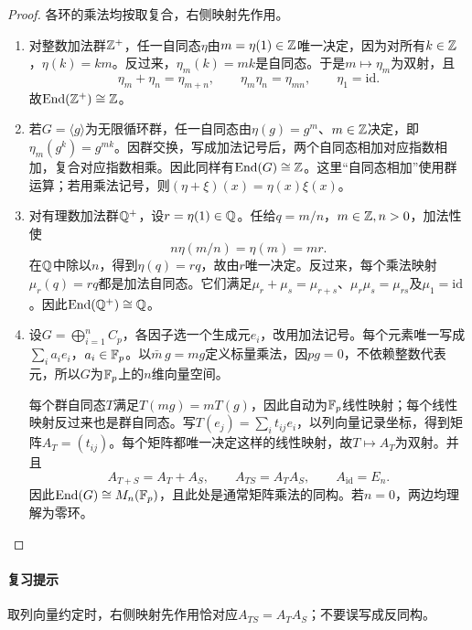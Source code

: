 \begin{proof}

各环的乘法均按取复合，右侧映射先作用。
\begin{enumerate}
\item 对整数加法群$\mathbb Z^+$，任一自同态$\eta$由$m=\eta(1)\in\mathbb Z$唯一决定，因为对所有$k\in\mathbb Z$，$\eta(k)=km$。反过来，$\eta_m(k)=mk$是自同态。于是$m\mapsto\eta_m$为双射，且
\[
\eta_m+\eta_n=\eta_{m+n},\qquad
\eta_m\eta_n=\eta_{mn},\qquad \eta_1=\mathrm{id}.
\]
故$\operatorname{End}(\mathbb Z^+)\cong\mathbb Z$。
\item 若$G=\langle g\rangle$为无限循环群，任一自同态由$\eta(g)=g^m$、$m\in\mathbb Z$决定，即$\eta_m(g^k)=g^{mk}$。因群交换，写成加法记号后，两个自同态相加对应指数相加，复合对应指数相乘。因此同样有$\operatorname{End}(G)\cong\mathbb Z$。这里“自同态相加”使用群运算；若用乘法记号，则$(\eta+\xi)(x)=\eta(x)\xi(x)$。
\item 对有理数加法群$\mathbb Q^+$，设$r=\eta(1)\in\mathbb Q$。任给$q=m/n$，$m\in\mathbb Z,n>0$，加法性使
\[
n\eta(m/n)=\eta(m)=mr.
\]
在$\mathbb Q$中除以$n$，得到$\eta(q)=rq$，故由$r$唯一决定。反过来，每个乘法映射$\mu_r(q)=rq$都是加法自同态。它们满足$\mu_r+\mu_s=\mu_{r+s}$、$\mu_r\mu_s=\mu_{rs}$及$\mu_1=\mathrm{id}$。因此$\operatorname{End}(\mathbb Q^+)\cong\mathbb Q$。
\item 设$G=\bigoplus\limits_{i=1}^n C_p$，各因子选一个生成元$e_i$，改用加法记号。每个元素唯一写成$\sum_i a_i e_i$，$a_i\in\mathbb F_p$。以$\bar m\,g=mg$定义标量乘法，因$pg=0$，不依赖整数代表元，所以$G$为$\mathbb F_p$上的$n$维向量空间。

每个群自同态$T$满足$T(mg)=mT(g)$，因此自动为$\mathbb F_p$线性映射；每个线性映射反过来也是群自同态。写$T(e_j)=\sum_i t_{ij}e_i$，以列向量记录坐标，得到矩阵$A_T=(t_{ij})$。每个矩阵都唯一决定这样的线性映射，故$T\mapsto A_T$为双射。并且
\[
A_{T+S}=A_T+A_S,\qquad A_{TS}=A_TA_S,\qquad
A_{\mathrm{id}}=E_n.
\]
因此$\operatorname{End}(G)\cong M_n(\mathbb F_p)$，且此处是通常矩阵乘法的同构。若$n=0$，两边均理解为零环。
\end{enumerate}

\end{proof}

\paragraph{复习提示}

取列向量约定时，右侧映射先作用恰对应$A_{TS}=A_TA_S$；不要误写成反同构。


